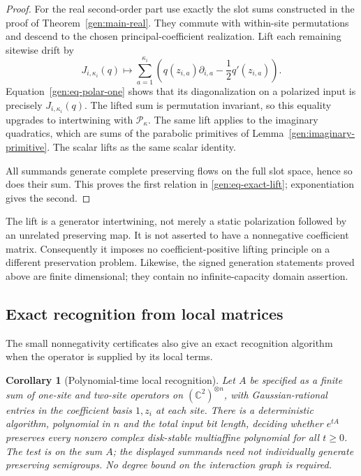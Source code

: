 \documentclass[reqno]{amsart}
\newtheorem{corollary}[theorem]{Corollary}
\theoremstyle{definition}
\theoremstyle{remark}
\newcommand{\C}{\mathbb C}
\begin{document}
\begin{proof}
For the real second-order part use exactly the slot sums
constructed in the proof of
Theorem~\ref{gen:main-real}.
They commute with within-site permutations and descend to the
chosen principal-coefficient realization.
Lift each remaining sitewise drift by
\[
 J_{i,\kappa_i}(q)
 \longmapsto
 \sum_{a=1}^{\kappa_i}
 \left(q(z_{i,a})\partial_{i,a}
                    -\frac12q'(z_{i,a})\right).
\]
Equation~\eqref{gen:eq-polar-one} shows that its diagonalization
on a polarized input is precisely \(J_{i,\kappa_i}(q)\).
The lifted sum is permutation invariant, so this equality
upgrades to intertwining with \(\mathcal P_\kappa\).
The same lift applies to the imaginary quadratics, which are
sums of the parabolic primitives of
Lemma~\ref{gen:imaginary-primitive}.
The scalar lifts as the same scalar identity.

All summands generate complete preserving flows on the full
slot space, hence so does their sum.
This proves the first relation in
\eqref{gen:eq-exact-lift}; exponentiation gives the second.
\end{proof}

The lift is a generator intertwining, not merely a static
polarization followed by an unrelated preserving map.
It is not asserted to have a nonnegative coefficient matrix.
Consequently it imposes no coefficient-positive lifting
principle on a different preservation problem.
Likewise, the signed generation statements proved above are
finite dimensional; they contain no infinite-capacity domain assertion.


\subsection{Exact recognition from local matrices}
\label{gen:recognition-subsection}

The small nonnegativity certificates also give an exact recognition
algorithm when the operator is supplied by its local terms.

\begin{corollary}[Polynomial-time local recognition]
\label{gen:recognition}
Let \(A\) be specified as a finite sum of one-site and two-site operators
on \((\C^2)^{\otimes n}\), with Gaussian-rational entries in the
coefficient basis \(1,z_i\) at each site. There is a deterministic
algorithm, polynomial in \(n\) and the total input bit length, deciding
whether \(e^{tA}\) preserves every nonzero complex disk-stable
multiaffine polynomial for all \(t\ge0\).
The test is on the sum \(A\); the displayed summands need not individually
generate preserving semigroups. No degree bound on the interaction
graph is required.
\end{corollary}
\end{document}
